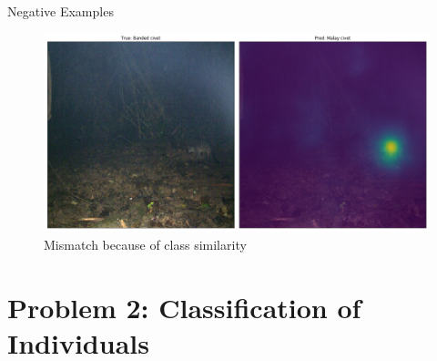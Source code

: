 \documentclass[10pt]{beamer}
\begin{document}
\begin{frame}{Negative Examples}
	\centering
	\begin{figure}
		\includegraphics[width=\columnwidth]{images/mismatch.png}
		\caption{Mismatch because of class similarity}
	\end{figure}
\end{frame}

\section{Problem 2: Classification of Individuals}
\end{document}
